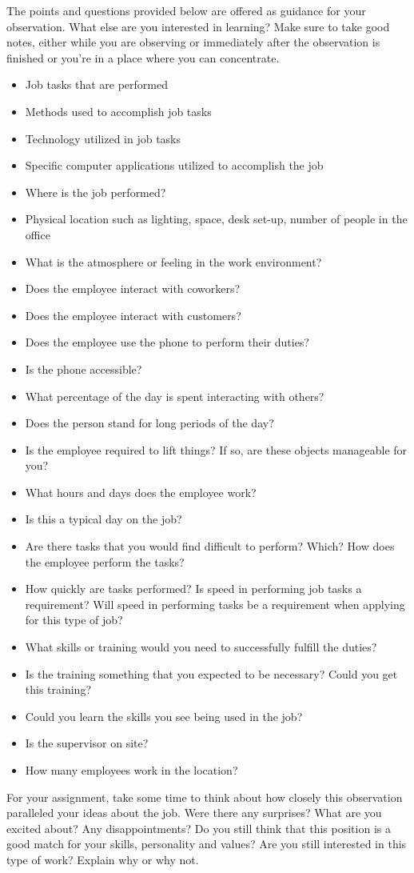 The points and questions provided below are offered as guidance for your observation. What else are you interested in learning? Make sure to take good notes, either while you are observing or immediately after the observation is finished or you're in a place where you can concentrate.
\begin{itemize}[leftmargin=1.0cm]
	\item Job tasks that are performed
	\item Methods used to accomplish job tasks
	\item Technology utilized in job tasks
	\item Specific computer applications utilized to accomplish the job
	\item Where is the job performed?
	\item Physical location such as lighting, space, desk set-up, number of people in the office
	\item What is the atmosphere or feeling in the work environment?
	\item Does the employee interact with coworkers?
	\item Does the employee interact with customers?
	\item Does the employee use the phone to perform their duties?
	\item Is the phone accessible?
	\item What percentage of the day is spent interacting with others?
	\item Does the person stand for long periods of the day?
	\item Is the employee required to lift things? If so, are these objects manageable for you?
	\item What hours and days does the employee work?
	\item Is this a typical day on the job?
	\item Are there tasks that you would find difficult to perform? Which? How does the employee perform the tasks?
	\item How quickly are tasks performed? Is speed in performing job tasks a requirement? Will speed in performing tasks be a requirement when applying for this type of job?
	\item What skills or training would you need to successfully fulfill the duties?
	\item Is the training something that you expected to be necessary? Could you get this training?
	\item Could you learn the skills you see being used in the job?
	\item Is the supervisor on site?
	\item How many employees work in the location?
\end{itemize}
For your assignment, take some time to think about how closely this observation paralleled your ideas about the job. Were there any surprises? What are you excited about? Any disappointments? Do you still think that this position is a good match for your skills, personality and values? Are you still interested in this type of work? Explain why or why not.

